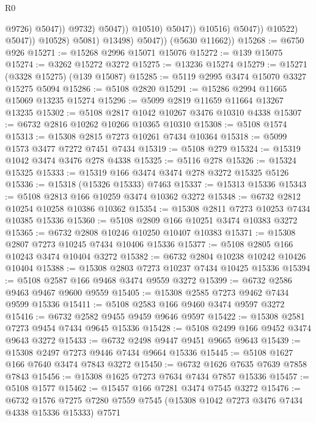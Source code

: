 \begin{lexlean}{R0}
\begin{coremodule}
                                              @9726)
                                            @5047))
                                        @9732)
                                      @5047))
                                  @10510)
                                @5047))
                            @10516)
                          @5047))
                      @10522)
                    @5047))
                @10528)
              @5081)
            @13498)
          @5047))
      (@5630 @11662))
@15268 := @6750 @926
@15271 := @15268 @2996 @15071 @15076
@15272 := @139 @15075
@15274 := @3262 @15272 @3272
@15275 := @13236 @15274
@15279 := @15271 (@3328 @15275) (@139 @15087)
@15285 := @5119 @2995 @3474 @15070 @3327 @15275 @5094
@15286 := @5108 @2820
@15291 := @15286 @2994 @11665 @15069 @13235 @15274
@15296 := @5099 @2819 @11659 @11664 @13267 @13235
@15302 := @5108 @2817 @1042 @10267 @3476 @10310 @4338
@15307 := @6732 @2816 @10262 @10266 @10365 @10310
@15308 := @5108 @1574
@15313 := @15308 @2815 @7273 @10261 @7434 @10364
@15318 := @5099 @1573 @3477 @7272 @7451 @7434
@15319 := @5108 @279
@15324 := @15319 @1042 @3474 @3476 @278 @4338
@15325 := @5116 @278
@15326 := @15324 @15325
@15333 := @15319 @166 @3474 @3474 @278 @3272 @15325 @5126
@15336 := @15318 (@15326 @15333) @7463
@15337 := @15313 @15336
@15343 := @5108 @2813 @166 @10259 @3474 @10362 @3272
@15348 := @6732 @2812 @10254 @10258 @10386 @10362
@15354 := @15308 @2811 @7273 @10253 @7434 @10385 @15336
@15360 := @5108 @2809 @166 @10251 @3474 @10383 @3272
@15365 := @6732 @2808 @10246 @10250 @10407 @10383
@15371 := @15308 @2807 @7273 @10245 @7434 @10406 @15336
@15377 := @5108 @2805 @166 @10243 @3474 @10404 @3272
@15382 := @6732 @2804 @10238 @10242 @10426 @10404
@15388 := @15308 @2803 @7273 @10237 @7434 @10425 @15336
@15394 := @5108 @2587 @166 @9468 @3474 @9559 @3272
@15399 := @6732 @2586 @9463 @9467 @9600 @9559
@15405 := @15308 @2585 @7273 @9462 @7434 @9599 @15336
@15411 := @5108 @2583 @166 @9460 @3474 @9597 @3272
@15416 := @6732 @2582 @9455 @9459 @9646 @9597
@15422 := @15308 @2581 @7273 @9454 @7434 @9645 @15336
@15428 := @5108 @2499 @166 @9452 @3474 @9643 @3272
@15433 := @6732 @2498 @9447 @9451 @9665 @9643
@15439 := @15308 @2497 @7273 @9446 @7434 @9664 @15336
@15445 := @5108 @1627 @166 @7640 @3474 @7843 @3272
@15450 := @6732 @1626 @7635 @7639 @7858 @7843
@15456 := @15308 @1625 @7273 @7634 @7434 @7857 @15336
@15457 := @5108 @1577
@15462 := @15457 @166 @7281 @3474 @7545 @3272
@15476 := @6732
    @1576
    @7275
    @7280
    @7559
    @7545
    (@15308 @1042 @7273 @3476 @7434 @4338 @15336 @15333)
    @7571

\end{coremodule}
\end{lexlean}
